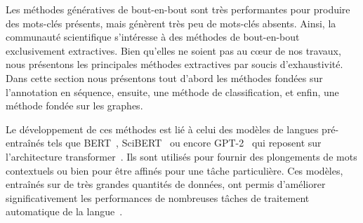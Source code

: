 Les méthodes génératives de bout-en-bout sont très performantes pour produire des mots-clés présents, mais génèrent très peu de mots-clés absents.
Ainsi, la communauté scientifique s'intéresse à des méthodes de bout-en-bout exclusivement extractives.
%
Bien qu'elles ne soient pas au c\oe{}ur de nos travaux, nous présentons les principales méthodes extractives par soucis d'exhaustivité.
Dans cette section nous présentons tout d'abord les méthodes fondées sur l'annotation en séquence, ensuite, une méthode de classification, et enfin, une méthode fondée sur les graphes.

Le développement de ces méthodes est lié à celui des modèles de langues pré-entraînés tels que BERT~\cite{devlin_bert_2019}, SciBERT~\cite{beltagy_scibert_2019} ou encore GPT-2~\cite{radford_language_2019} qui reposent sur l'architecture transformer~\cite{vaswani_attention_2017}.
Ils sont utilisés pour fournir des plongements de mots contextuels ou bien pour être affinés pour une tâche particulière.
Ces modèles, entraînés sur de très grandes quantités de données, ont permis d'améliorer significativement les performances de nombreuses tâches de traitement automatique de la langue~\cite{wang_glue_2018}.

